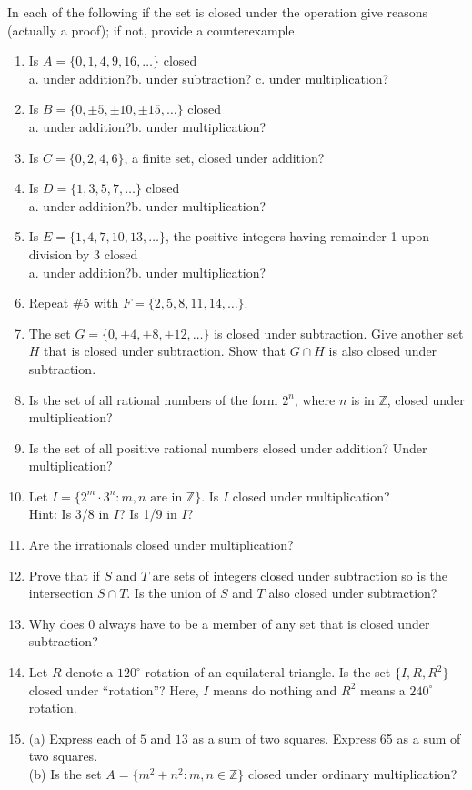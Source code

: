 \documentclass[12pt]{book}
\theoremstyle{definition}
\begin{document}
In each of the following if the set is closed under the operation give reasons (actually a proof); if not, provide a counterexample.
\begin{enumerate}
	\item Is $A=\{0,1,4,9,16,\dots\}$ closed\\
	a. under addition?\qquad b. under subtraction? \qquad c. under multiplication?
	\item Is $B=\{0,\pm5,\pm10,\pm15,\dots\}$ closed\\
	a. under addition?\qquad b. under multiplication?
	\item Is $C=\{0,2,4,6\}$, a finite set, closed under addition?
	\item Is $D=\{1,3,5,7,\dots\}$ closed\\
	a. under addition?\qquad b. under multiplication?
	\item Is $E=\{1,4,7,10,13,\dots\}$, the positive integers having remainder 1 upon division by 3 closed\\
	a. under addition?\qquad b. under multiplication?
	\item Repeat \#5 with $F=\{2,5,8,11,14,\dots\}$.
	\item The set $G=\{0,\pm4,\pm8,\pm12,\dots\}$ is closed under subtraction.  Give another set $H$ that is closed under subtraction.  Show that $G\cap H$ is also closed under subtraction.
	\item Is the set of all rational numbers of the form $2^n$, where $n$ is in $\mathbb{Z}$, closed under multiplication?
	\item Is the set of all positive rational numbers closed under addition?  Under multiplication?
	\item Let $I=\{2^m\cdot3^n:m,n \text{ are in } \mathbb{Z}\}$.  Is $I$ closed under multiplication?\\
	Hint:  Is 3/8 in $I$?  Is 1/9 in $I$?
	\item Are the irrationals closed under multiplication?
	\item Prove that if $S$ and $T$ are sets of integers closed under subtraction so is the intersection $S\cap T$.  Is the union of $S$ and $T$ also closed under subtraction?
	\item Why does 0 always have to be a member of any set that is closed under subtraction?
	\item Let $R$ denote a $120^\circ$ rotation of an equilateral triangle.  Is the set $\{I,R,R^2\}$ closed under ``rotation''?  Here, $I$ means do nothing and $R^2$ means a $240^\circ$ rotation.
	
	\item 
	(a) Express each of $ 5 $ and $ 13 $ as a sum of two squares. Express 65 as a sum of two squares.\\
	(b) Is the set $ A=\{m^2+n^2:m,n\in \mathbb{Z}\} $ closed under ordinary multiplication?
	
\end{enumerate}
\end{document}
